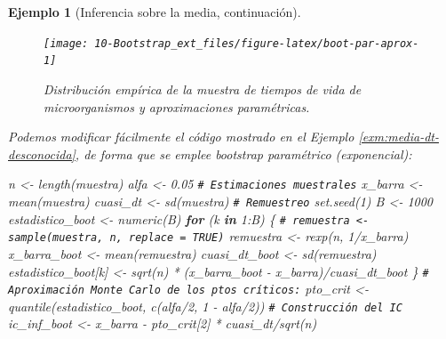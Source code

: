 \documentclass[
  10pt,
]{book}
\newenvironment{Shaded}{\begin{snugshade}}{\end{snugshade}}
\newcommand{\CommentTok}[1]{\textcolor[rgb]{0.56,0.35,0.01}{\textit{#1}}}
\newcommand{\ControlFlowTok}[1]{\textcolor[rgb]{0.13,0.29,0.53}{\textbf{#1}}}
\newcommand{\DecValTok}[1]{\textcolor[rgb]{0.00,0.00,0.81}{#1}}
\newcommand{\FloatTok}[1]{\textcolor[rgb]{0.00,0.00,0.81}{#1}}
\newcommand{\FunctionTok}[1]{\textcolor[rgb]{0.00,0.00,0.00}{#1}}
\newcommand{\NormalTok}[1]{#1}
\newcommand{\OtherTok}[1]{\textcolor[rgb]{0.56,0.35,0.01}{#1}}
\newcommand{\SpecialCharTok}[1]{\textcolor[rgb]{0.00,0.00,0.00}{#1}}
\theoremstyle{break}
\newtheorem{example}{Ejemplo}[chapter]
\theoremstyle{nonumberplain}
\renewcommand{\CommentTok}[1]{\textcolor[rgb]{0.41,0.41,0.41}{\texttt{#1}}}
\begin{document}
\begin{example}[Inferencia sobre la media, continuación]
\begin{figure}[!htbp]

{\centering \texttt{[image: 10-Bootstrap\_ext\_files/figure-latex/boot-par-aprox-1]} 

}

\caption{Distribución empírica de la muestra de tiempos de vida de microorganismos y aproximaciones paramétricas.}\label{fig:boot-par-aprox}
\end{figure}

Podemos modificar fácilmente el código mostrado en el Ejemplo \ref{exm:media-dt-desconocida}, de forma que se emplee bootstrap paramétrico (exponencial):

\begin{Shaded}
\begin{Highlighting}[]
\NormalTok{n }\OtherTok{\textless{}{-}} \FunctionTok{length}\NormalTok{(muestra)}
\NormalTok{alfa }\OtherTok{\textless{}{-}} \FloatTok{0.05}
\CommentTok{\# Estimaciones muestrales}
\NormalTok{x\_barra }\OtherTok{\textless{}{-}} \FunctionTok{mean}\NormalTok{(muestra)}
\NormalTok{cuasi\_dt }\OtherTok{\textless{}{-}} \FunctionTok{sd}\NormalTok{(muestra)}
\CommentTok{\# Remuestreo}
\FunctionTok{set.seed}\NormalTok{(}\DecValTok{1}\NormalTok{)}
\NormalTok{B }\OtherTok{\textless{}{-}} \DecValTok{1000}
\NormalTok{estadistico\_boot }\OtherTok{\textless{}{-}} \FunctionTok{numeric}\NormalTok{(B)}
\ControlFlowTok{for}\NormalTok{ (k }\ControlFlowTok{in} \DecValTok{1}\SpecialCharTok{:}\NormalTok{B) \{}
  \CommentTok{\# remuestra \textless{}{-} sample(muestra, n, replace = TRUE)}
\NormalTok{  remuestra }\OtherTok{\textless{}{-}} \FunctionTok{rexp}\NormalTok{(n, }\DecValTok{1}\SpecialCharTok{/}\NormalTok{x\_barra)}
\NormalTok{  x\_barra\_boot }\OtherTok{\textless{}{-}} \FunctionTok{mean}\NormalTok{(remuestra)}
\NormalTok{  cuasi\_dt\_boot }\OtherTok{\textless{}{-}} \FunctionTok{sd}\NormalTok{(remuestra)}
\NormalTok{  estadistico\_boot[k] }\OtherTok{\textless{}{-}} \FunctionTok{sqrt}\NormalTok{(n) }\SpecialCharTok{*}\NormalTok{ (x\_barra\_boot }\SpecialCharTok{{-}}\NormalTok{ x\_barra)}\SpecialCharTok{/}\NormalTok{cuasi\_dt\_boot}
\NormalTok{\}}
\CommentTok{\# Aproximación Monte Carlo de los ptos críticos:}
\NormalTok{pto\_crit }\OtherTok{\textless{}{-}} \FunctionTok{quantile}\NormalTok{(estadistico\_boot, }\FunctionTok{c}\NormalTok{(alfa}\SpecialCharTok{/}\DecValTok{2}\NormalTok{, }\DecValTok{1} \SpecialCharTok{{-}}\NormalTok{ alfa}\SpecialCharTok{/}\DecValTok{2}\NormalTok{))}
\CommentTok{\# Construcción del IC}
\NormalTok{ic\_inf\_boot }\OtherTok{\textless{}{-}}\NormalTok{ x\_barra }\SpecialCharTok{{-}}\NormalTok{ pto\_crit[}\DecValTok{2}\NormalTok{] }\SpecialCharTok{*}\NormalTok{ cuasi\_dt}\SpecialCharTok{/}\FunctionTok{sqrt}\NormalTok{(n)}

\end{Highlighting}
\end{Shaded}
\end{example}
\end{document}
